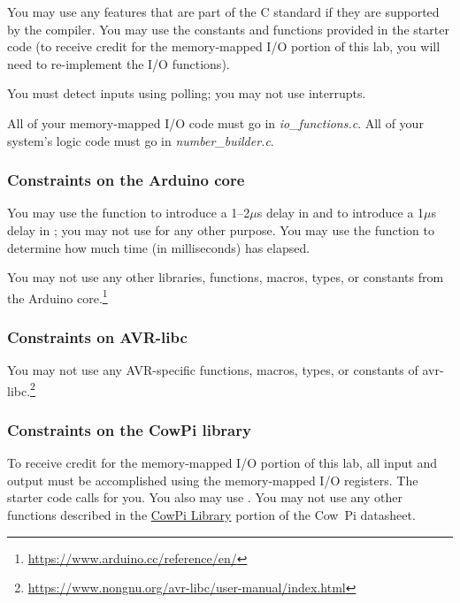 You may use any features that are part of the C standard if they are supported by the compiler.
You may use the constants and functions provided in the starter code
(to receive credit for the memory-mapped I/O portion of this lab, you will need to re-implement the I/O functions).

You must detect inputs using polling;
you may not use interrupts.

All of your memory-mapped I/O code must go in \textit{io\_functions.c}.
All of your system's logic code must go in \textit{number\_builder.c}.

\subsubsection{Constraints on the Arduino core}

You may use the  function to introduce a 1--2$\mu$s delay in  and to introduce a 1$\mu$s delay in ;
you may not use  for any other purpose.
You may use the  function to determine how much time (in milliseconds) has elapsed.

You may not use any other libraries, functions, macros, types, or constants from the Arduino core.\footnote{\url{https://www.arduino.cc/reference/en/}}

\subsubsection{Constraints on AVR-libc}

You may not use any AVR-specific functions, macros, types, or constants of avr-libc.\footnote{\url{https://www.nongnu.org/avr-libc/user-manual/index.html}}

\subsubsection{Constraints on the CowPi library}

To receive credit for the memory-mapped I/O portion of this lab, all input and
output must be accomplished using the memory-mapped I/O registers.
The starter code calls  for you.
You also may use \href{https://cow-pi.readthedocs.io/en/latest/CowPi/inputs.html#debouncing}{}.
You may not use any other functions described in the \href{https://cow-pi.readthedocs.io/en/latest/library.html}{CowPi Library} portion of the Cow~Pi datasheet.

